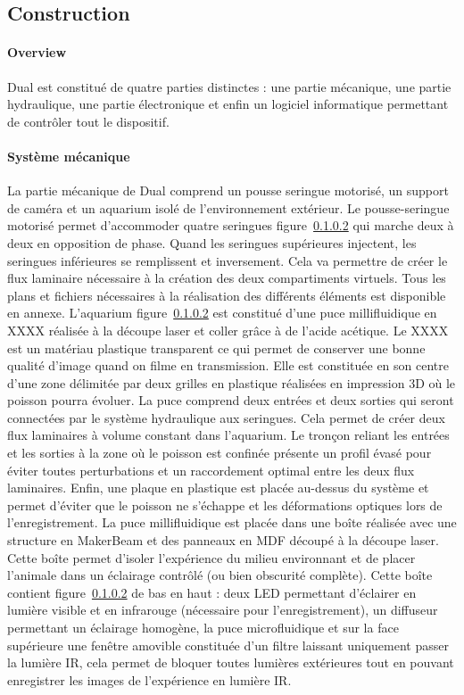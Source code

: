   \subsection{Construction}
  \paragraph{Overview}
  Dual est constitué de quatre parties distinctes : une partie mécanique, une partie hydraulique, une partie électronique et enfin un logiciel informatique permettant de contrôler tout le dispositif.
  \paragraph{Système mécanique}
  La partie mécanique de Dual comprend un pousse seringue motorisé, un support de caméra et un aquarium isolé de l'environnement extérieur. Le pousse-seringue motorisé permet d'accommoder quatre seringues figure~\ref{} qui marche deux à deux en opposition de phase. Quand les seringues supérieures injectent, les seringues inférieures se remplissent et inversement. Cela va permettre de créer le flux laminaire nécessaire à la création des deux compartiments virtuels. Tous les plans et fichiers nécessaires à la réalisation des différents éléments est disponible en annexe.
  \medbreak
  L'aquarium figure~\ref{} est constitué d'une puce millifluidique en XXXX réalisée à la découpe laser et coller grâce à de l'acide acétique. Le XXXX est un matériau plastique transparent ce qui permet de conserver une bonne qualité d'image quand on filme en transmission. Elle est constituée en son centre d'une zone délimitée par deux grilles en plastique réalisées en impression 3D où le poisson pourra évoluer. La puce comprend deux entrées et deux sorties qui seront connectées par le système hydraulique aux seringues. Cela permet de créer deux flux laminaires à volume constant dans l'aquarium. Le tronçon reliant les entrées et les sorties à la zone où le poisson est confinée présente un profil évasé pour éviter toutes perturbations et un raccordement optimal entre les deux flux laminaires. Enfin, une plaque en plastique est placée au-dessus du système et permet d'éviter que le poisson ne s'échappe et les déformations optiques lors de l'enregistrement.
  \medbreak
  La puce millifluidique est placée dans une boîte réalisée avec une structure en MakerBeam et des panneaux en MDF découpé à la découpe laser. Cette boîte permet d'isoler l'expérience du milieu environnant et de placer l'animale dans un éclairage contrôlé (ou bien obscurité complète). Cette boîte contient figure~\ref{} de bas en haut : deux LED permettant d'éclairer en lumière visible et en infrarouge (nécessaire pour l'enregistrement), un diffuseur permettant un éclairage homogène, la puce microfluidique et sur la face supérieure une fenêtre amovible constituée d'un filtre laissant uniquement passer la lumière IR, cela permet de bloquer toutes lumières extérieures tout en pouvant enregistrer les images de l'expérience en lumière IR.
